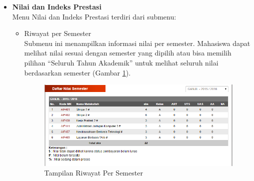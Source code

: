\begin{enumerate}
\begin{itemize}
		\item \textbf{Nilai dan Indeks Prestasi}\\
		Menu Nilai dan Indeks Prestasi terdiri dari submenu: 
		\begin{itemize}
			\item Riwayat per Semester \\
			Submenu ini menampilkan informasi nilai per semester. Mahasiswa dapat melihat nilai sesuai dengan semester yang dipilih atau bisa memilih
pilihan ``Seluruh Tahun Akademik'' untuk melihat seluruh nilai berdasarkan semester (Gambar \ref{fig:3_pam_utama_nilai}).
			\begin{figure}[H]
				\centering
				\includegraphics[scale=0.5]{Gambar/pam-utama-nilai}
				\caption{Tampilan Riwayat Per Semester} 
				\label{fig:3_pam_utama_nilai}
			\end{figure}
			

\end{itemize}
\end{itemize}
\end{enumerate}
